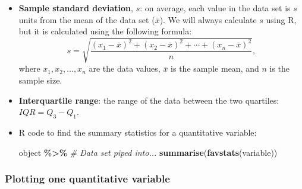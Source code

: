 \documentclass[
]{report}
\newenvironment{Shaded}{\begin{snugshade}}{\end{snugshade}}
\newcommand{\CommentTok}[1]{\textcolor[rgb]{0.56,0.35,0.01}{\textit{#1}}}
\newcommand{\FunctionTok}[1]{\textcolor[rgb]{0.13,0.29,0.53}{\textbf{#1}}}
\newcommand{\NormalTok}[1]{#1}
\newcommand{\SpecialCharTok}[1]{\textcolor[rgb]{0.81,0.36,0.00}{\textbf{#1}}}
\begin{document}
\begin{itemize}
\item
  \textbf{Sample standard deviation}, \(s\): on average, each value in the data set is \(s\) units from the mean of the data set (\(\bar{x}\)). We will always calculate \(s\) using R, but it is calculated using the following formula:
  \[
  s = \sqrt{\frac{(x_1-\bar{x})^2 + (x_2-\bar{x})^2 + \cdots + (x_n-\bar{x})^2}{n}},
  \]
  where \(x_1, x_2, \ldots, x_n\) are the data values, \(\bar{x}\) is the sample mean, and \(n\) is the sample size.
\item
  \textbf{Interquartile range}: the range of the data between the two quartiles: \(IQR = Q_3-Q_1\).
\item
  R code to find the summary statistics for a quantitative variable:

\begin{Shaded}
\begin{Highlighting}[]
\NormalTok{object }\SpecialCharTok{\%\textgreater{}\%} \CommentTok{\# Data set piped into...}
    \FunctionTok{summarise}\NormalTok{(}\FunctionTok{favstats}\NormalTok{(variable))}
\end{Highlighting}
\end{Shaded}
\end{itemize}

\subsubsection*{Plotting one quantitative variable}\label{plotting-one-quantitative-variable}
\end{document}
